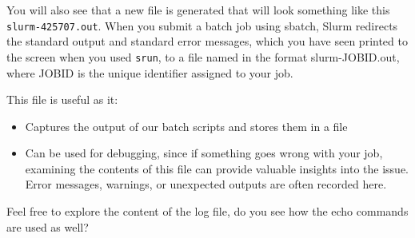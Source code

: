 \documentclass[
  letterpaper,
  DIV=11,
  numbers=noendperiod]{scrreprt}
\providecommand{\tightlist}{%
  \setlength{\itemsep}{0pt}\setlength{\parskip}{0pt}}\usepackage{longtable,booktabs,array}
\begin{document}
You will also see that a new file is generated that will look something
like this \texttt{slurm-425707.out}. When you submit a batch job using
sbatch, Slurm redirects the standard output and standard error messages,
which you have seen printed to the screen when you used \texttt{srun},
to a file named in the format slurm-JOBID.out, where JOBID is the unique
identifier assigned to your job.

This file is useful as it:

\begin{itemize}
\tightlist
\item
  Captures the output of our batch scripts and stores them in a file
\item
  Can be used for debugging, since if something goes wrong with your
  job, examining the contents of this file can provide valuable insights
  into the issue. Error messages, warnings, or unexpected outputs are
  often recorded here.
\end{itemize}

Feel free to explore the content of the log file, do you see how the
echo commands are used as well?
\end{document}

